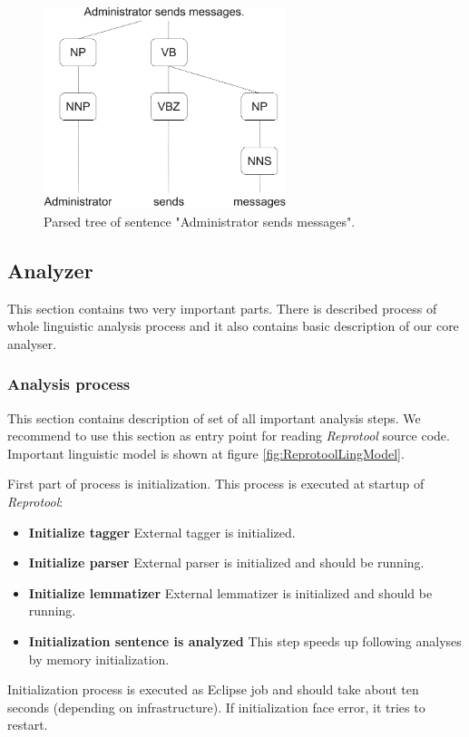 \begin{figure}[ht]
  \centering
  \includegraphics[width=200pt]{images/ParsedTree}
  \caption{Parsed tree of sentence "Administrator sends messages".}
  \label{fig:ParsedTree}
\end{figure}

\subsection{Analyzer}
\label{sec:analyzer}
This section contains two very important parts. There is described process of whole linguistic analysis process and it also contains basic description of our core analyser.

\subsubsection{Analysis process}
This section contains description of set of all important analysis steps. We recommend to use this section as entry point for reading \emph{Reprotool} source code.
Important linguistic model is shown at figure \ref{fig:ReprotoolLingModel}. 

First part of process is initialization. This process is executed at startup of \emph{Reprotool}:

\begin{itemize}
\item {\bf Initialize tagger} External tagger is initialized.
\item {\bf Initialize parser} External parser is initialized and should be running.
\item {\bf Initialize lemmatizer} External lemmatizer is initialized  and should be running.
\item {\bf Initialization sentence is analyzed} This step speeds up following analyses by memory initialization.
\end{itemize}

Initialization process is executed as Eclipse job and should take about ten seconds (depending on infrastructure). If initialization face error, it tries to restart.

